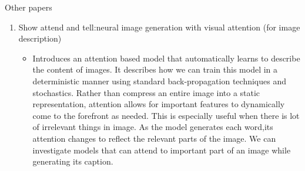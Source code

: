 \documentclass[pdf]{beamer}
\begin{document}
\begin{frame}[allowframebreaks]{Other papers}
\begin{enumerate}
        
         \item Show attend and tell:neural image generation with visual attention (for image description) \cite{show-attend-and-tell}
         \begin{itemize}
             \item Introduces an attention based model that automatically learns to describe the content of images. It describes how we can train this model in a deterministic manner using standard back-propagation techniques and stochastics. Rather than compress an entire image into a static representation, attention allows for important features to dynamically come to the forefront as needed. This is especially useful when
there is lot of irrelevant things in image. As the model generates each word,its attention changes to reflect the relevant parts of the image. We can investigate models that can attend to important part of an image while generating its caption.

         \end{itemize}
         
         
    \end{enumerate}
        
    \end{frame}
    
\end{document}
